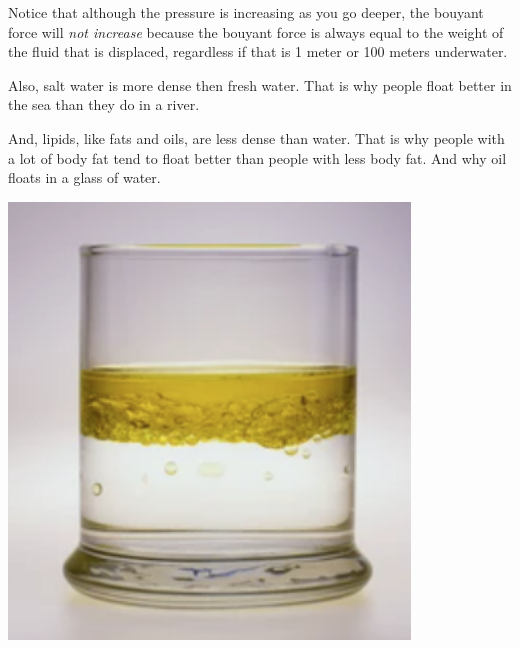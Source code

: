 Notice that although the pressure is increasing as you go deeper, the
bouyant force will \emph{not increase} because the bouyant force is always equal
to the weight of the fluid that is displaced, regardless if that is 1
meter or 100 meters underwater.

Also, salt water is more dense then fresh water. That is why people float
better in the sea than they do in a river.

And, lipids, like fats and oils, are less dense than water. That is why
people with a lot of body fat tend to float better than people with
less body fat. And why oil floats in a glass of water.

\includegraphics[width=0.8\textwidth]{Oil_Water.png}

